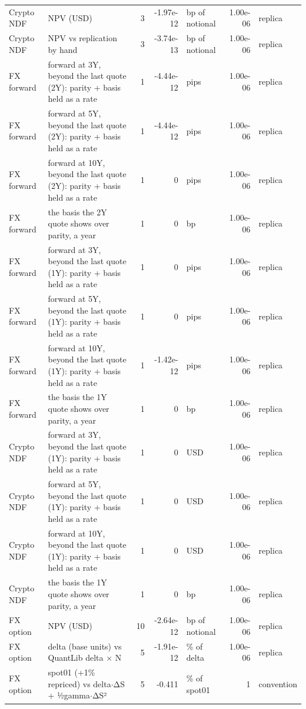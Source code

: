 \documentclass[11pt,a4paper]{article}
\begin{document}
{\begin{longtable}{>{\raggedright\arraybackslash}p{2.2cm}>{\raggedright\arraybackslash}p{4.6cm} r r >{\raggedright\arraybackslash}p{1.8cm} r >{\raggedright\arraybackslash}p{1.8cm}}
Crypto NDF & NPV (USD) & 3 & -1.97e-12 & bp of notional & 1.00e-06 & replica \\
Crypto NDF & NPV vs replication by hand & 3 & -3.74e-13 & bp of notional & 1.00e-06 & replica \\
FX forward & forward at 3Y, beyond the last quote (2Y): parity + basis held as a rate & 1 & -4.44e-12 & pips & 1.00e-06 & replica \\
FX forward & forward at 5Y, beyond the last quote (2Y): parity + basis held as a rate & 1 & -4.44e-12 & pips & 1.00e-06 & replica \\
FX forward & forward at 10Y, beyond the last quote (2Y): parity + basis held as a rate & 1 & 0 & pips & 1.00e-06 & replica \\
FX forward & the basis the 2Y quote shows over parity, a year & 1 & 0 & bp & 1.00e-06 & replica \\
FX forward & forward at 3Y, beyond the last quote (1Y): parity + basis held as a rate & 1 & 0 & pips & 1.00e-06 & replica \\
FX forward & forward at 5Y, beyond the last quote (1Y): parity + basis held as a rate & 1 & 0 & pips & 1.00e-06 & replica \\
FX forward & forward at 10Y, beyond the last quote (1Y): parity + basis held as a rate & 1 & -1.42e-12 & pips & 1.00e-06 & replica \\
FX forward & the basis the 1Y quote shows over parity, a year & 1 & 0 & bp & 1.00e-06 & replica \\
Crypto NDF & forward at 3Y, beyond the last quote (1Y): parity + basis held as a rate & 1 & 0 & USD & 1.00e-06 & replica \\
Crypto NDF & forward at 5Y, beyond the last quote (1Y): parity + basis held as a rate & 1 & 0 & USD & 1.00e-06 & replica \\
Crypto NDF & forward at 10Y, beyond the last quote (1Y): parity + basis held as a rate & 1 & 0 & USD & 1.00e-06 & replica \\
Crypto NDF & the basis the 1Y quote shows over parity, a year & 1 & 0 & bp & 1.00e-06 & replica \\
FX option & NPV (USD) & 10 & -2.64e-12 & bp of notional & 1.00e-06 & replica \\
FX option & delta (base units) vs QuantLib delta × N & 5 & -1.91e-12 & \% of delta & 1.00e-06 & replica \\
FX option & spot01 (+1\% repriced) vs delta$\cdot$ΔS + ½gamma$\cdot$ΔS² & 5 & -0.411 & \% of spot01 & 1 & convention \\

\end{longtable}}
\end{document}
